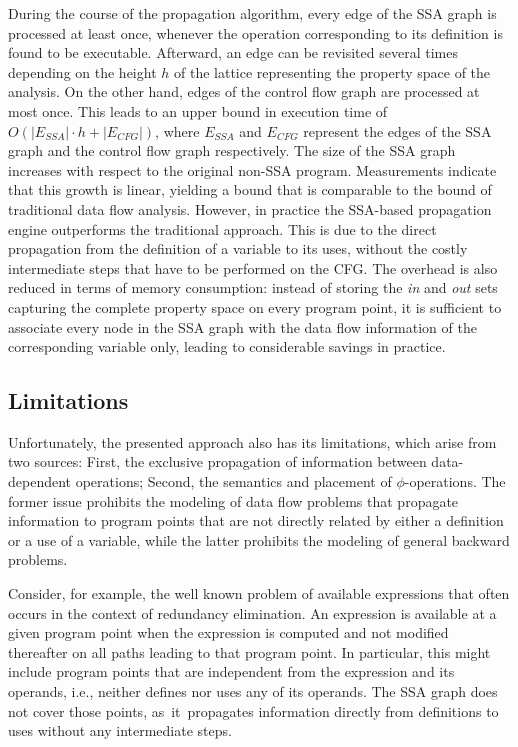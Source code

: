 {
\def\ESSA{E_{\textit{SSA}}}
\def\ECFG{E_{\textit{CFG}}}
During the course of the propagation algorithm, every edge of the SSA graph is
processed at least once, whenever the operation corresponding to its definition
is found to be executable. Afterward, an edge can be revisited several times
depending on the height $h$ of the lattice representing the property
space of the analysis. On the other hand, edges of the control flow graph are processed at most
once. This leads to an upper bound in execution time of $O(|\ESSA| \cdot h +
|\ECFG|)$, where $\ESSA$ and $\ECFG$ represent the edges of the SSA graph
and the control flow graph respectively. The size of the
SSA graph increases with respect to the original non-SSA program. Measurements
indicate that this growth is linear, yielding a
bound that is comparable to the bound of traditional data flow analysis.
However, in practice the SSA-based propagation engine outperforms the
traditional approach. This is  due to the direct propagation from the definition
of a variable to its uses, without the costly intermediate steps that have to be
performed on the CFG. The overhead is also reduced in terms of memory
consumption: instead of storing the \emph{in} and \emph{out} sets capturing the
complete property space on every program point, it is sufficient to
associate every node in the SSA graph with the data flow information of the
corresponding variable only, leading to considerable savings in practice.
}

\subsection{Limitations}

Unfortunately, the presented approach also has its limitations, which arise from
two sources: First, the exclusive
propagation of information between data-dependent operations; Second, the
semantics and placement of $\phi$-operations. The former issue prohibits the
modeling of data flow problems that propagate information to program points that
are not directly related by either a definition or a use of a variable, while
the latter prohibits the modeling of general backward problems.

Consider, for example, the well known problem of available
expressions that often occurs in the context of
redundancy elimination. An expression is available at a given program point when
the expression is computed and not modified thereafter on all paths leading to
that program point. In particular, this might include program points that are
independent from the expression and its operands, i.e., neither defines nor uses
any of its operands. The SSA graph does not cover those points,
as~it~propagates information directly from definitions to uses without any
intermediate steps.

